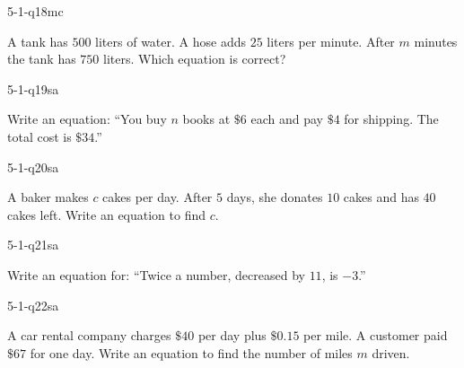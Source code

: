 \begin{practiceQuestion}{5-1-q18}{mc}
\begin{questionText}
A tank has $500$ liters of water. A hose adds $25$ liters per minute. After $m$ minutes the tank has $750$ liters. Which equation is correct?
\end{questionText}
\end{practiceQuestion}


\begin{practiceQuestion}{5-1-q19}{sa}
\begin{questionText}
Write an equation: ``You buy $n$ books at $\$6$ each and pay $\$4$ for shipping. The total cost is $\$34$.''
\end{questionText}
\end{practiceQuestion}

\begin{practiceQuestion}{5-1-q20}{sa}
\begin{questionText}
A baker makes $c$ cakes per day. After $5$ days, she donates $10$ cakes and has $40$ cakes left. Write an equation to find $c$.
\end{questionText}
\end{practiceQuestion}

\begin{practiceQuestion}{5-1-q21}{sa}
\begin{questionText}
Write an equation for: ``Twice a number, decreased by $11$, is $-3$.''
\end{questionText}
\end{practiceQuestion}

\begin{practiceQuestion}{5-1-q22}{sa}
\begin{questionText}
A car rental company charges $\$40$ per day plus $\$0.15$ per mile. A customer paid $\$67$ for one day. Write an equation to find the number of miles $m$ driven.
\end{questionText}
\end{practiceQuestion}

